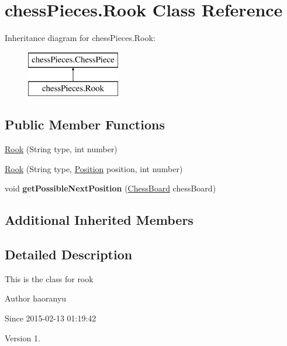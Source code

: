 \hypertarget{classchess_pieces_1_1_rook}{\section{chess\+Pieces.\+Rook Class Reference}
\label{classchess_pieces_1_1_rook}
}
Inheritance diagram for chess\+Pieces.\+Rook\+:\begin{figure}[H]
\begin{center}
\leavevmode
\includegraphics[height=2.000000cm]{classchess_pieces_1_1_rook}
\end{center}
\end{figure}
\subsection*{Public Member Functions}
\begin{DoxyCompactItemize}
\item 
\hyperlink{classchess_pieces_1_1_rook_a6f70e418c517ef9042b4d5f55ced440d}{Rook} (String type, int number)
\item 
\hyperlink{classchess_pieces_1_1_rook_abf88a6f46fee569655f05f56ed50631a}{Rook} (String type, \hyperlink{classmodels_1_1_position}{Position} position, int number)
\item 
\hypertarget{classchess_pieces_1_1_rook_a181f0cc6c985dd7c11689a62ebb63282}{void {\bfseries get\+Possible\+Next\+Position} (\hyperlink{classmodels_1_1_chess_board}{Chess\+Board} chess\+Board)}\label{classchess_pieces_1_1_rook_a181f0cc6c985dd7c11689a62ebb63282}

\end{DoxyCompactItemize}
\subsection*{Additional Inherited Members}


\subsection{Detailed Description}
This is the class for rook \begin{DoxyAuthor}{Author}
haoranyu 
\end{DoxyAuthor}
\begin{DoxySince}{Since}
2015-\/02-\/13 01\+:19\+:42 
\end{DoxySince}
\begin{DoxyVersion}{Version}
1. 
\end{DoxyVersion}


